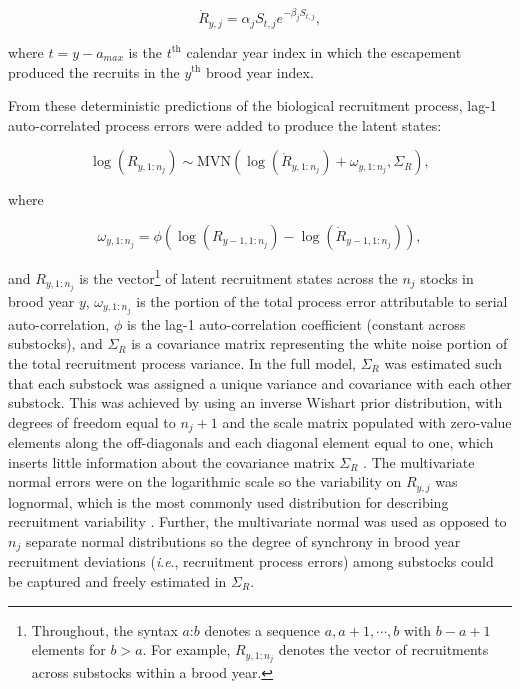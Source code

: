 \documentclass[12pt,]{book}
\let\rmarkdownfootnote\footnote%
\def\footnote{\protect\rmarkdownfootnote}
\theoremstyle{definition}
\theoremstyle{definition}
\theoremstyle{definition}
\theoremstyle{remark}
\begin{document}
\begin{equation}
  \dot{R}_{y,j} = \alpha_j S_{t,j} e^{-\beta_j S_{t,j}},
  \label{eq:tsm-ricker-pred}
\end{equation}

\noindent
where \(t = y-a_{max}\) is the \(t^{\text{th}}\) calendar year index in
which the escapement produced the recruits in the \(y^{\text{th}}\)
brood year index.

From these deterministic predictions of the biological recruitment
process, lag-1 auto-correlated process errors were added to produce the
latent states:

\begin{equation}
  \log(R_{y,1:n_j}) \sim \text{MVN}\left(\log(\dot{R}_{y,1:n_j}) + \omega_{y,1:n_j}, \Sigma_R\right),
  \label{eq:tsm-ricker-anomalies}
\end{equation}

\noindent
where

\begin{equation}
  \omega_{y,1:n_j} = \phi \left(\log(R_{y-1,1:n_j}) - \log(\dot{R}_{y-1,1:n_j}) \right),
  \label{eq:tsm-omega}
\end{equation}

\noindent
and \(R_{y,1:n_j}\) is the vector\footnote{Throughout, the syntax
  \(a\):\(b\) denotes a sequence \(a, a+1, \cdots, b\) with
  \(b - a + 1\) elements for \(b > a\). For example, \(R_{y,1:n_j}\)
  denotes the vector of recruitments across substocks within a brood
  year.} of latent recruitment states across the \(n_j\) stocks in brood
year \(y\), \(\omega_{y,1:n_j}\) is the portion of the total process
error attributable to serial auto-correlation, \(\phi\) is the lag-1
auto-correlation coefficient (constant across substocks), and
\(\Sigma_R\) is a covariance matrix representing the white noise portion
of the total recruitment process variance. In the full model,
\(\Sigma_R\) was estimated such that each substock was assigned a unique
variance and covariance with each other substock. This was achieved by
using an inverse Wishart prior distribution, with degrees of freedom
equal to \(n_j + 1\) and the scale matrix populated with zero-value
elements along the off-diagonals and each diagonal element equal to one,
which inserts little information about the covariance matrix
\(\Sigma_R\) \citep{plummer-2017}. The multivariate normal errors were
on the logarithmic scale so the variability on \(R_{y,j}\) was
lognormal, which is the most commonly used distribution for describing
recruitment variability \citep{walters-martell-2004}. Further, the
multivariate normal was used as opposed to \(n_j\) separate normal
distributions so the degree of synchrony in brood year recruitment
deviations (\emph{i}.\emph{e}., recruitment process errors) among
substocks could be captured and freely estimated in \(\Sigma_R\).
\end{document}
